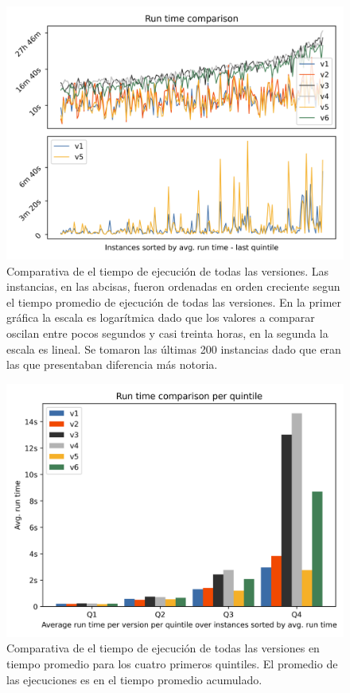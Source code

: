 \documentclass{article}
\begin{document}
  \begin{figure}[h!]
    \centering
    \includegraphics[width=12cm]{../resources/run_time_comparsion.png}
    \caption{Comparativa de el tiempo de ejecución de todas las versiones. Las instancias, en las abcisas, fueron ordenadas en orden creciente segun el tiempo promedio de ejecución de todas las versiones. En la primer gráfica la escala es logarítmica dado que los valores a comparar oscilan entre pocos segundos y casi treinta horas, en la segunda la escala es lineal. Se tomaron las últimas 200 instancias dado que eran las que presentaban diferencia más notoria.}
    \label{fig:runtimecomparison}
  \end{figure}

  \begin{figure}[h!]
    \centering
    \includegraphics[width=12cm]{../resources/run_time_comparsion_by_quintile.png}
      \caption{Comparativa de el tiempo de ejecución de todas las versiones en tiempo promedio para los cuatro primeros quintiles. El promedio de las ejecuciones es en el tiempo promedio acumulado.}
    \label{fig:firstfourquintiles}
  \end{figure}
\end{document}
